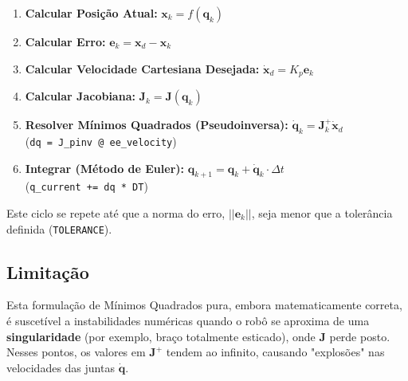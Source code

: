 \documentclass[a4paper, 12pt]{article}
\begin{document}
\begin{enumerate}
    \item \textbf{Calcular Posição Atual:} $\mathbf{x}_k = f(\mathbf{q}_k)$
    \item \textbf{Calcular Erro:} $\mathbf{e}_k = \mathbf{x}_d - \mathbf{x}_k$
    \item \textbf{Calcular Velocidade Cartesiana Desejada:} $\dot{\mathbf{x}}_d = K_p \mathbf{e}_k$
    \item \textbf{Calcular Jacobiana:} $\mathbf{J}_k = \mathbf{J}(\mathbf{q}_k)$
    \item \textbf{Resolver Mínimos Quadrados (Pseudoinversa):} $\dot{\mathbf{q}}_k = \mathbf{J}_k^+ \dot{\mathbf{x}}_d$ \\
    (\texttt{dq = J\_pinv @ ee\_velocity})
    \item \textbf{Integrar (Método de Euler):} $\mathbf{q}_{k+1} = \mathbf{q}_k + \dot{\mathbf{q}}_k \cdot \Delta t$ \\
    (\texttt{q\_current += dq * DT})
\end{enumerate}
Este ciclo se repete até que a norma do erro, $|| \mathbf{e}_k ||$, seja menor que a tolerância definida (\texttt{TOLERANCE}).

\subsection{Limitação}
Esta formulação de Mínimos Quadrados pura, embora matematicamente correta, é suscetível a instabilidades numéricas quando o robô se aproxima de uma \textbf{singularidade} (por exemplo, braço totalmente esticado), onde $\mathbf{J}$ perde posto. Nesses pontos, os valores em $\mathbf{J}^+$ tendem ao infinito, causando "explosões" nas velocidades das juntas $\dot{\mathbf{q}}$.
\end{document}
